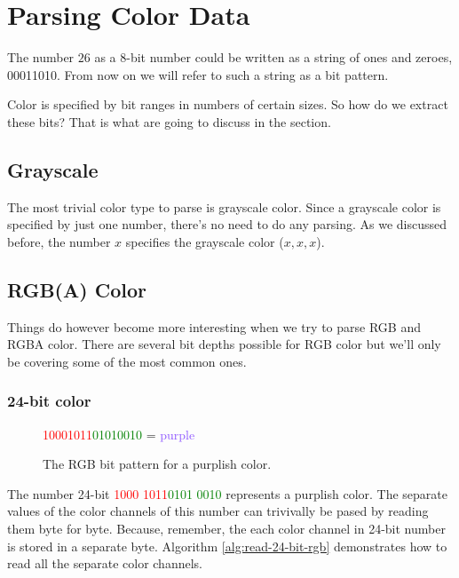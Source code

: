 \section{Parsing Color Data}
\label{sec:parsing-color-data}

The number $26$ as a 8-bit number could be written as a string of
ones and zeroes, 00011010. From now on we will refer to such a
string as a bit pattern.

Color is specified by bit ranges in numbers of certain
sizes. So how do we extract these bits? That is what are going to
discuss in the section.

\subsection{Grayscale}

The most trivial color type to parse is grayscale color. Since a
grayscale color is specified by just one number, there's no need to
do any parsing. As we discussed before, the number $x$ specifies the
grayscale color \mbox{($x,x,x$)}. 

\subsection{RGB(A) Color}

Things do however become more interesting when we try to parse RGB
and RGBA color. There are several bit depths possible for RGB
color but we'll only be covering some of the most common ones.

\subsubsection{24-bit color}

\begin{figure}
  \centering
  {\huge\textcolor{red}{10001011}\textcolor{green}{01010010}\textcolor{blue}{\fullbyte}
    = \textcolor[HTML]{8B52FF}{purple}}
  \caption{The RGB bit pattern for a purplish color.}
  \label{fig:24-bit-colors-bits}
\end{figure}

The number 24-bit \textcolor{red}{1000 1011}\textcolor{green}{0101
  0010}\textcolor{blue}{\fullbyte} represents a purplish color. The
separate values of the color channels of this number can trivivally
be pased by reading them byte for byte. Because, remember, the each
color channel in 24-bit number is stored in a separate
byte. Algorithm \ref{alg:read-24-bit-rgb} demonstrates how to read
all the separate color channels.

